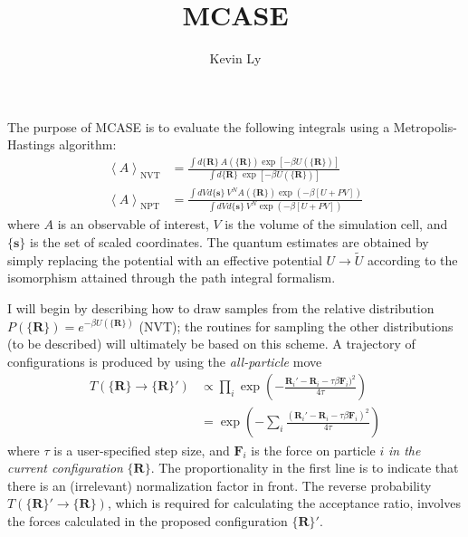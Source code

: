\documentclass{article}
\title{MCASE}
\author{Kevin Ly}
\newcommand{\mean}[1]{\left\langle #1 \right\rangle}
\begin{document}
    \maketitle

    \onehalfspacing

The purpose of MCASE is to evaluate the following integrals using a Metropolis-Hastings algorithm:
%
\begin{equation}
    \label{eq:stat_mech_integrals}
    \begin{split}
        \mean{A}_{\text{NVT}} &= \frac{
            \int d\{\boldsymbol{R}\} \ A(\{\boldsymbol{R}\}) \exp[-\beta U(\{\boldsymbol{R}\})]
        }{
            \int d\{\boldsymbol{R}\} \ \exp[-\beta U(\{\boldsymbol{R}\})]
        } \\
        \mean{A}_{\text{NPT}} &= \frac{
            \int dV d\{\boldsymbol{s}\} \ V^N A(\{\boldsymbol{R}\}) \exp(-\beta[ U + P V])
            }{
            \int dV d\{\boldsymbol{s}\} \ V^N \exp(-\beta [U + P V])
            }
    \end{split}
\end{equation}
%
where $A$ is an observable of interest, $V$ is the volume of the simulation cell, and $\{\boldsymbol{s}\}$ is the set of scaled coordinates.
The quantum estimates are obtained by simply replacing the potential with an effective potential $U \to \tilde{U}$ according to the isomorphism attained through the path integral formalism.


I will begin by describing how to draw samples from the relative distribution $P(\{\boldsymbol{R}\}) = e^{-\beta U(\{\boldsymbol{R}\})}$ (NVT); the routines for sampling the other distributions (to be described) will ultimately be based on this scheme.
A trajectory of configurations is produced by using the \emph{all-particle} move
%
\begin{equation}
    \label{eq:all_particle_move}
    \begin{split}
        T(\{\boldsymbol{R}\} \to \{\boldsymbol{R}\}') &\propto \prod_i \exp \left( - \frac{\boldsymbol{R}_i' - \boldsymbol{R}_i - \tau \beta \boldsymbol{F}_i)^2}{4 \tau} \right) \\
        &= \exp \left( -\sum_i \frac{(\boldsymbol{R}_i' - \boldsymbol{R}_i - \tau \beta \boldsymbol{F}_i)^2}{4 \tau} \right)
    \end{split}
\end{equation}
%
where $\tau$ is a user-specified step size, and $\boldsymbol{F}_i$ is the force on particle $i$ \emph{in the current configuration} $\{\boldsymbol{R}\}$.
The proportionality in the first line is to indicate that there is an (irrelevant) normalization factor in front.
The reverse probability $T(\{\boldsymbol{R}\}' \to \{\boldsymbol{R}\})$, which is required for calculating the acceptance ratio, involves the forces calculated in the proposed configuration $\{\boldsymbol{R}\}'$.
\end{document}
